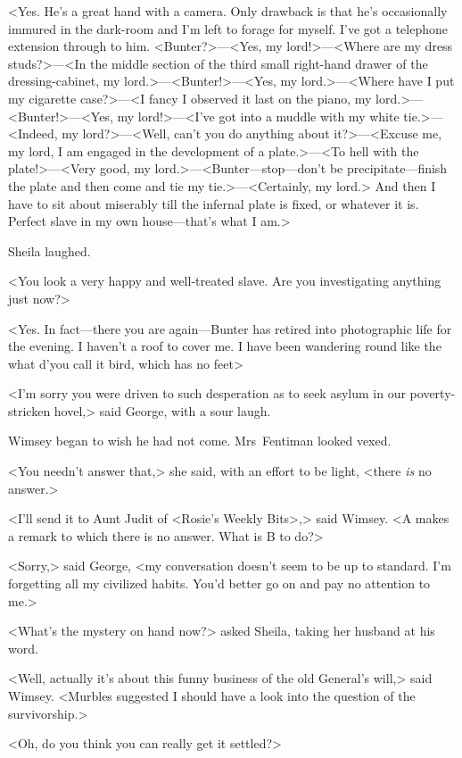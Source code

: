 <Yes. He's a great hand with a camera. Only drawback is that he's occasionally immured in the dark-room and I'm left to forage for myself. I've got a telephone extension through to him. <Bunter?>—<Yes, my lord!>—<Where are my dress studs?>—<In the middle section of the third small right-hand drawer of the dressing-cabinet, my lord.>—<Bunter!>—<Yes, my lord.>—<Where have I put my cigarette case?>—<I fancy I observed it last on the piano, my lord.>—<Bunter!>—<Yes, my lord!>—<I've got into a muddle with my white tie.>—<Indeed, my lord?>—<Well, can't you do anything about it?>—<Excuse me, my lord, I am engaged in the development of a plate.>—<To hell with the plate!>—<Very good, my lord.>—<Bunter—stop—don't be precipitate—finish the plate and then come and tie my tie.>—<Certainly, my lord.> And then I have to sit about miserably till the infernal plate is fixed, or whatever it is. Perfect slave in my own house—that's what I am.>

Sheila laughed.

<You look a very happy and well-treated slave. Are you investigating anything just now?>

<Yes. In fact—there you are again—Bunter has retired into photographic life for the evening. I haven't a roof to cover me. I have been wandering round like the what d'you call it bird, which has no feet\longdash>

<I'm sorry you were driven to such desperation as to seek asylum in our poverty-stricken hovel,> said George, with a sour laugh.

Wimsey began to wish he had not come. Mrs~Fentiman looked vexed.

<You needn't answer that,> she said, with an effort to be light, <there \emph{is} no answer.>

<I'll send it to Aunt Judit of <Rosie's Weekly Bits>,> said Wimsey. <A makes a remark to which there is no answer. What is B to do?>

<Sorry,> said George, <my conversation doesn't seem to be up to standard. I'm forgetting all my civilized habits. You'd better go on and pay no attention to me.>

<What's the mystery on hand now?> asked Sheila, taking her husband at his word.

<Well, actually it's about this funny business of the old General's will,> said Wimsey. <Murbles suggested I should have a look into the question of the survivorship.>

<Oh, do you think you can really get it settled?>

